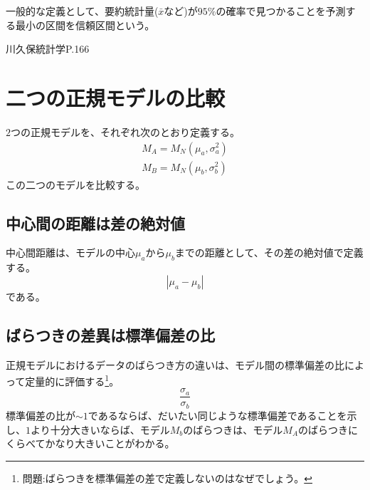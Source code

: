 一般的な定義として、要約統計量($\bar{x}$など)が$95\%$の確率で見つかることを予測する最小の区間を信頼区間という。

\fi

 川久保統計学P.166
 \fi






\section{二つの正規モデルの比較}
$2$つの正規モデルを、それぞれ次のとおり定義する。
\begin{eqnarray*}
 M_A = M_N(\mu_a,\sigma_a^2) \\
 M_B = M_N(\mu_b,\sigma_b^2)
\end{eqnarray*}
この二つのモデルを比較する。

\subsection{中心間の距離は差の絶対値}
中心間距離は、モデルの中心$\mu_a$から$\mu_b$までの距離として、その差の絶対値で定義する。
\begin{equation*}
 |\mu_a - \mu_b|
\end{equation*}
である。

\subsection{ばらつきの差異は標準偏差の比}
正規モデルにおけるデータのばらつき方の違いは、モデル間の標準偏差の比によって定量的に評価する\footnote{問題:ばらつきを標準偏差の差で定義しないのはなぜでしょう。}。
\begin{equation*}
 \frac{\sigma_a}{\sigma_b}
\end{equation*}
標準偏差の比が$\sim 1$であるならば、だいたい同じような標準偏差であることを示し、$1$より十分大きいならば、モデル$M_b$のばらつきは、モデル$M_A$のばらつきにくらべてかなり大きいことがわかる。

